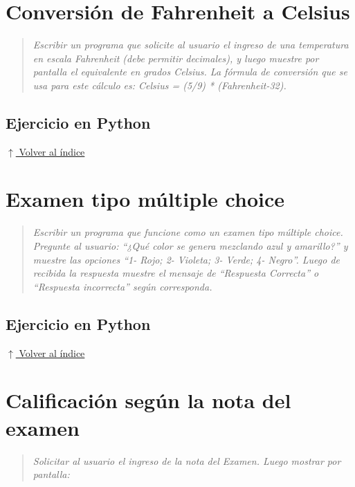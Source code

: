 \documentclass[12pt]{article}
\newcommand{\codigopython}[2]{%
}
\newcommand{\volverindice}{%
    \vspace{1em}%
    \begin{flushright}%
        \hyperlink{indice}{\small $\uparrow$ Volver al índice}%
    \end{flushright}%
}
\newcommand{\enunciado}[1]{%
    \begin{quote}
        \itshape #1
    \end{quote}
}
\begin{document}
\section{Conversión de Fahrenheit a Celsius}

\enunciado{Escribir un programa que solicite al usuario el ingreso de una temperatura en escala Fahrenheit (debe permitir decimales), y luego muestre por pantalla el equivalente en grados Celsius. La fórmula de conversión que se usa para este cálculo es: Celsius = (5/9) * (Fahrenheit-32).}

\subsection*{Ejercicio en Python}

\codigopython{06}{Conversión de Fahrenheit a Celsius}

\volverindice
\newpage


\section{Examen tipo múltiple choice}

\enunciado{Escribir un programa que funcione como un examen tipo múltiple choice. Pregunte al usuario: \enquote{¿Qué color se genera mezclando azul y amarillo?} y muestre las opciones \enquote{1- Rojo; 2- Violeta; 3- Verde; 4- Negro}. Luego de recibida la respuesta muestre el mensaje de \enquote{Respuesta Correcta} o \enquote{Respuesta incorrecta} según corresponda.}

\subsection*{Ejercicio en Python}

\codigopython{07}{Examen tipo múltiple choice}

\volverindice
\newpage


\section{Calificación según la nota del examen}

\enunciado{Solicitar al usuario el ingreso de la nota del Examen. Luego mostrar por pantalla:}
\end{document}

